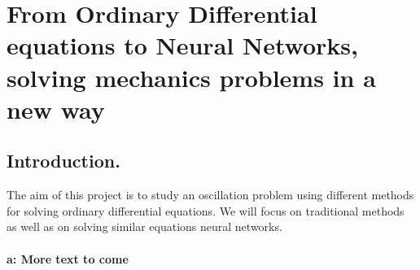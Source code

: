 





\section*{From Ordinary Differential equations to Neural Networks, solving mechanics problems in a new way}

\subsection*{Introduction.}

The aim of this project is to study an oscillation problem using different methods for
solving ordinary differential equations. We will focus on traditional methods as well as
on solving similar equations neural networks.


\paragraph{a: More text to come}








